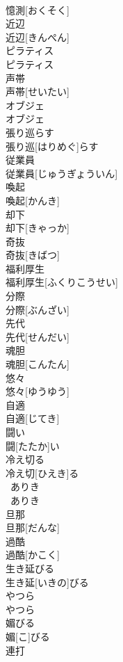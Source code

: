\documentclass[8pt]{extreport}
\begin{document}
\begin{CJK}{UTF8}{min}
\\	憶測[おくそく]	
\\	近辺	
\\	近辺[きんぺん]	
\\	ピラティス	
\\	ピラティス	
\\	声帯	
\\	声帯[せいたい]	
\\	オブジェ	
\\	オブジェ	
\\	張り巡らす	
\\	張り巡[はりめぐ]らす	
\\	従業員	
\\	従業員[じゅうぎょういん]	
\\	喚起	
\\	喚起[かんき]	
\\	却下	
\\	却下[きゃっか]	
\\	奇抜	
\\	奇抜[きばつ]	
\\	福利厚生	
\\	福利厚生[ふくりこうせい]	
\\	分際	
\\	分際[ぶんざい]	
\\	先代	
\\	先代[せんだい]	
\\	魂胆	
\\	魂胆[こんたん]	
\\	悠々	
\\	悠々[ゆうゆう]	
\\	自適	
\\	自適[じてき]	
\\	闘い	
\\	闘[たたか]い	
\\	冷え切る	
\\	冷え切[ひえき]る	
\\	~ありき	
\\	~ありき	
\\	旦那	
\\	旦那[だんな]	
\\	過酷	
\\	過酷[かこく]	
\\	生き延びる	
\\	生き延[いきの]びる	
\\	やつら	
\\	やつら	
\\	媚びる	
\\	媚[こ]びる	
\\	連打	

\end{CJK}
\end{document}
